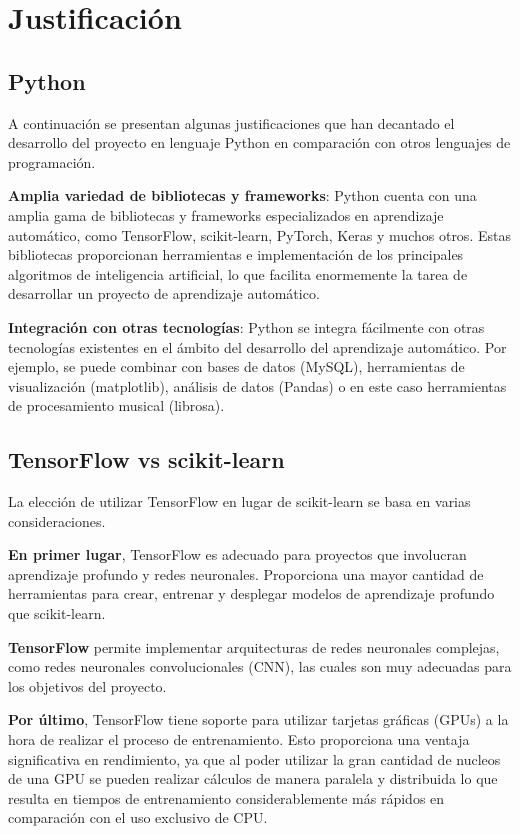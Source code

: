 \section{Justificación}

\subsection{Python}
A continuación se presentan algunas justificaciones que han decantado el desarrollo del proyecto en lenguaje Python en comparación con otros lenguajes de programación.

\textbf{Amplia variedad de bibliotecas y frameworks}: Python cuenta con una amplia gama de bibliotecas y frameworks especializados en aprendizaje automático, como TensorFlow, scikit-learn, PyTorch, Keras y muchos otros. 
Estas bibliotecas proporcionan herramientas e implementación de los principales algoritmos de inteligencia artificial, lo que facilita enormemente la tarea de desarrollar un proyecto de aprendizaje automático.

\textbf{Integración con otras tecnologías}: Python se integra fácilmente con otras tecnologías existentes en el ámbito del desarrollo del aprendizaje automático. Por ejemplo, se puede combinar con bases de datos (MySQL), herramientas de visualización (matplotlib), análisis de datos (Pandas) o en este caso herramientas de procesamiento musical (librosa).

\subsection{TensorFlow vs scikit-learn}
La elección de utilizar TensorFlow en lugar de scikit-learn se basa en varias consideraciones.

\textbf{En primer lugar}, TensorFlow es adecuado para proyectos que involucran aprendizaje profundo y redes neuronales. Proporciona una mayor cantidad de herramientas para crear, entrenar y desplegar modelos de aprendizaje profundo que scikit-learn. 

\textbf{TensorFlow} permite implementar arquitecturas de redes neuronales complejas, como redes neuronales convolucionales (CNN), las cuales son muy adecuadas para los objetivos del proyecto.

\textbf{Por último}, TensorFlow tiene soporte para utilizar tarjetas gráficas (GPUs) a la hora de realizar el proceso de entrenamiento. Esto proporciona una ventaja significativa en rendimiento, ya que al poder utilizar la gran cantidad de nucleos de una GPU se pueden realizar cálculos de manera paralela y distribuida lo que resulta en tiempos
de entrenamiento considerablemente más rápidos en comparación con el uso exclusivo de CPU.

